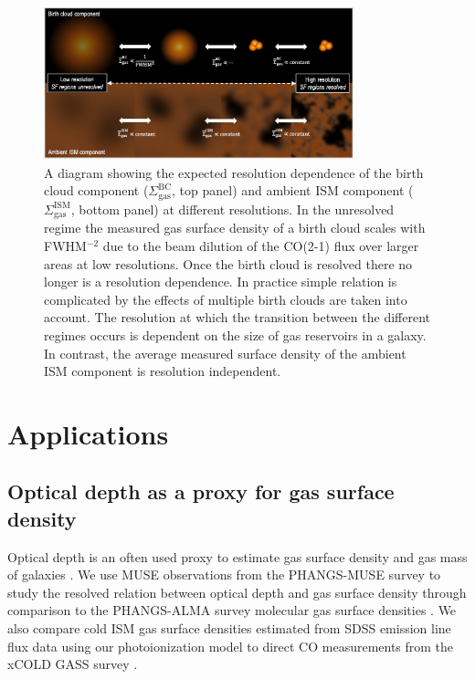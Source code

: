 \documentclass[fleqn,usenatbib]{mnras}
\begin{document}
\begin{figure}
    \centering
    \includegraphics[width=0.8\textwidth]{figures/fig6.png}
    \caption{A diagram showing the expected resolution dependence of the birth cloud component ($\Sigma_{\textrm{gas}}^{\textrm{BC}}$, top panel) and ambient ISM component ($\Sigma_{\textrm{gas}}^{\textrm{ISM}}$, bottom panel) at different resolutions. In the unresolved regime the measured gas surface density of a birth cloud scales with FWHM$^{-2}$ due to the beam dilution of the CO(2-1) flux over larger areas at low resolutions. Once the birth cloud is resolved there no longer is a resolution dependence. In practice simple relation is complicated by the effects of multiple birth clouds are taken into account. The resolution at which the transition between the different regimes occurs is dependent on the size of gas reservoirs in a galaxy. In contrast, the average measured surface density of the ambient ISM component is resolution independent.}
    \label{fig:diagram_resolution_dependence_gas_cloud}
\end{figure}

\section{Applications}

\subsection{Optical depth as a proxy for gas surface density}
\label{sec:gas_surface_density}
Optical depth is an often used proxy to estimate gas surface density and gas mass of galaxies \citep[e.g.][]{guver2009, heiderman2010, brinchmann2013, concas2019}. We use MUSE observations from the PHANGS-MUSE survey \citep{emsellem2021} to study the resolved relation between optical depth and gas surface density through comparison to the PHANGS-ALMA survey molecular gas surface densities \citep{leroy2021}. We also compare cold ISM gas surface densities estimated from SDSS emission line flux data using our photoionization model to direct CO measurements from the xCOLD GASS survey \citep{saintonge2017}.
\end{document}
